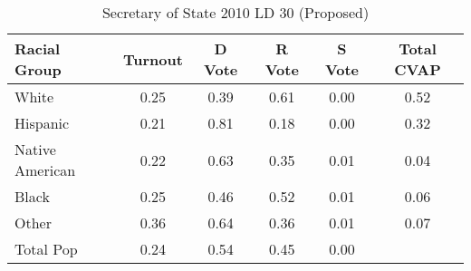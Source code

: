 \begin{table}[htb]
\begin{center}
\caption{Secretary of State 2010 LD 30 (Proposed)}
\label{sos10_cvap_ld_30}
\begin{tabular}{lccccc}
  \hline
Racial Group & Turnout & D Vote & R Vote & S Vote & Total CVAP \\ 
  \hline
White & 0.25 & 0.39 & 0.61 & 0.00 & 0.52 \\ 
  Hispanic & 0.21 & 0.81 & 0.18 & 0.00 & 0.32 \\ 
  Native American & 0.22 & 0.63 & 0.35 & 0.01 & 0.04 \\ 
  Black & 0.25 & 0.46 & 0.52 & 0.01 & 0.06 \\ 
  Other & 0.36 & 0.64 & 0.36 & 0.01 & 0.07 \\ 
  Total Pop & 0.24 & 0.54 & 0.45 & 0.00 &  \\ 
   \hline
\end{tabular}
\end{center}
\end{table}
